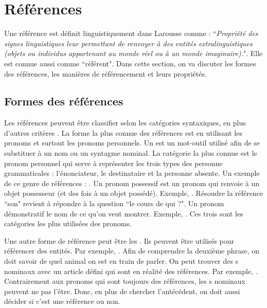 \documentclass{KodeBook}
\begin{document}
\section{Références}

Une référence est définit linguistiquement dans Larousse comme : ``\textit{Propriété des signes linguistiques leur permettant de renvoyer à des entités extralinguistiques (objets ou individus appartenant au monde réel ou à un monde imaginaire).}". 
Elle est connue aussi comme ``référent".
Dans cette section, on va discuter les formes des références, les manières de référencement et leurs propriétés.

\subsection{Formes des références}

Les références peuvent être classifier selon les catégories syntaxiques, en plus d'autres critères \cite{2015-schmolz}.
La forme la plus connue des références est en utilisant les pronoms et surtout les pronoms personnels.
Un  est un mot-outil utilisé afin de se substituer à un nom ou un syntagme nominal. 
La catégorie la plus connue est le pronom personnel qui serve à représenter les trois types des personne grammaticales : l'énonciateur, le destinataire et la personne absente. 
Un exemple de ce genre de références :  .
Un pronom possessif est un pronom qui renvoie à un objet possesseur (et des fois à un objet possédé).
Exemple, .
Résoudre la référence ``son" revient à répondre à la question ``le cours de qui ?". 
Un pronom démonstratif le nom de ce qu'on veut montrer.
Exemple, . 
Ces trois sont les catégories les plus utilisées des pronoms.

Une autre forme de référence peut être les .
Ils peuvent être utilisés pour référencer des entités.
Par exemple, .
Afin de comprendre la deuxième phrase, on doit savoir de quel animal on est en train de parler. 
On peut trouver des s nominaux avec un article défini qui sont en réalité des références. 
Par exemple, .
Contrairement aux pronoms qui sont toujours des références, les s nominaux peuvent ne pas l'être. 
Donc, en plus de chercher l'antécédent, on doit aussi décider si c'est une référence ou non.
\end{document}
